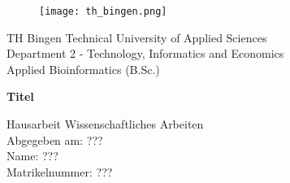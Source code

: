 \begin{titlepage}

	\begin{figure}
	\texttt{[image: th\_bingen.png]}
	\end{figure}
	
	\begin{center}
	\large
	TH Bingen Technical University of Applied Sciences\\
    Department 2 - Technology, Informatics and Economics\\
    Applied Bioinformatics (B.Sc.)\\
    \vspace{0.5cm}
	
    \huge
    \textbf{Titel} 
    \vfill
    
    \large
    Hausarbeit Wissenschaftliches Arbeiten\\
    Abgegeben am: ???\\
    Name: ???\\
    Matrikelnummer: ???\\
    \vspace{0.5cm}
	\end{center}
	
\end{titlepage}

